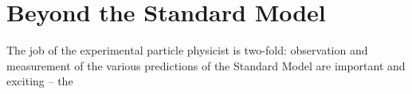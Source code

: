\chapter{Beyond the Standard Model}
The job of the experimental particle physicist is two-fold: observation and measurement of the various predictions of the Standard Model are important and exciting -- the 
